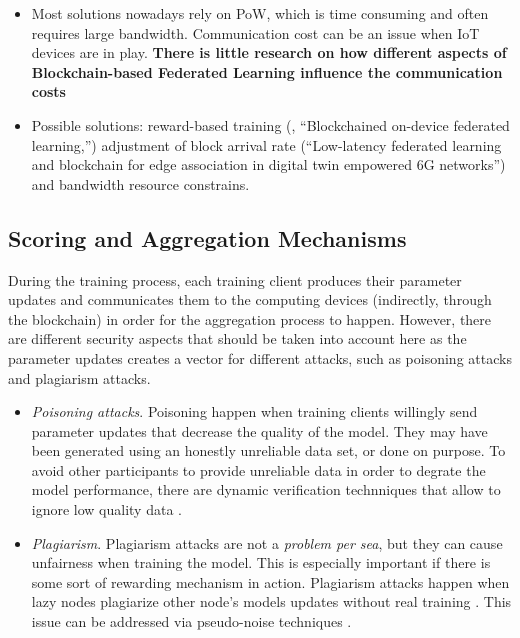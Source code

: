 \begin{itemize}
    \item Most solutions nowadays rely on PoW, which is time consuming and often requires large bandwidth. Communication cost can be an issue when IoT devices are in play. \textbf{There is little research on how different aspects of Blockchain-based Federated Learning influence the communication costs} \cite{9403374}
    
    \item Possible solutions: reward-based training (\cite{9079513}, “Blockchained on-device federated learning,”) adjustment of block arrival rate (“Low-latency federated learning and blockchain for edge association in digital twin empowered 6G networks”) and bandwidth resource constrains.
\end{itemize}

\subsection{Scoring and Aggregation Mechanisms}


During the training process, each training client produces their parameter updates and communicates them to the computing devices (indirectly, through the blockchain) in order for the aggregation process to happen. However, there are different security aspects that should be taken into account here as the parameter updates creates a vector for different attacks, such as poisoning attacks and plagiarism attacks.

\begin{itemize}
    \item \textit{Poisoning attacks}. Poisoning happen when training clients willingly send parameter updates that decrease the quality of the model. They may have been generated using an honestly unreliable data set, or done on purpose. To avoid other participants to provide unreliable data in order to degrate the model performance, there are dynamic verification technniques that allow to ignore low quality data \cite{10.48550/arxiv.2110.02182, 10.48550/arxiv.2104.10501}.
    
    \item \textit{Plagiarism}. Plagiarism attacks are not a \textit{problem per sea}, but they can cause unfairness when training the model. This is especially important if there is some sort of rewarding mechanism in action. Plagiarism attacks happen when lazy nodes plagiarize other node's models updates without real training \cite{9403374}. This issue can be addressed via pseudo-noise techniques \cite{10.48550/arxiv.2009.09338}.
\end{itemize}


